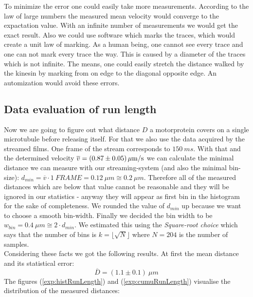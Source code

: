                 \label{velodist}
                \vspace{2mm}
        To minimize the error one could easily take more measurements. According to the law of large numbers the measured mean velocity would converge to the expactation value. With an infinite number of measurements we would get the exact result. 
        Also we could use software which marks the traces, which would create a unit law of marking. As a human being, one cannot see every trace and one can not mark every trace the way. This is caused by a diameter of the traces which is not infinite. The means, one could easily stretch the distance walked by the kinesin by marking from on edge to the diagonal opposite edge. An automization would avoid these errors. 
    
    \subsection{Data evaluation of run length}
    	Now we are going to figure out what distance $D$ a motorprotein covers on a single microtubule before releasing itself. For that we also use the data acquired by the streamed films. One frame of the stream corresponds to $150\ \unit{ms}$. With that and the determined velocity $\overline v = \unit[(0.87 \pm 0.05)]{\mu m/s}$ we can calculate the minimal distance we can measure with our streaming-system (and also the minimal bin-size): $d_{min} = \overline{v} \cdot 1\ \unit{FRAME} = 0.12\ \unit{\mu m} \cong 0.2\ \unit{\mu m}$. Therefore all of the measured distances which are below that value cannot be reasonable and they will be ignored in our statistics - anyway they will appear as first bin in the histogram for the sake of completeness. We rounded the value of $d_{min}$ up because we want to choose a smooth bin-width. Finally we decided the bin width to be $w_{bin} = 0.4\ \unit{\mu m} \cong 2 \cdot {d_{min}}$. We estimated this using the \textit{Square-root choice}\cite{wikiHisto} which says that the number of bins is $k = \lfloor\sqrt{N}\rfloor$ where $N = 204$ is the number of samples.\\
    	Considering these facts we got the following results. At first the mean distance and its statistical error:
    	\begin{equation*}
    		\overline{D} = (1.1 \pm 0.1)\ \unit{\mu m}
    	\end{equation*}
    	The figures (\ref{exp:histRunLength}) and  (\ref{exp:cumuRunLength}) visualise the distribution of the measured distances:
    	 \minipanf

